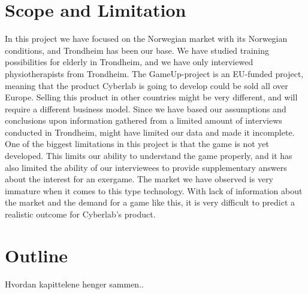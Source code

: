 \section{Scope and Limitation}
In this project we have focused on the Norwegian market with its Norwegian conditions, and Trondheim has been our base. We have studied training possibilities for elderly in Trondheim, and we have only interviewed physiotherapists from Trondheim. The GameUp-project is an EU-funded project, meaning that the product Cyberlab is going to develop could be sold all over Europe.  Selling this product in other countries might be very different, and will require a different business model. Since we have based our assumptions and conclusions upon information gathered from a limited amount of interviews conducted in Trondheim, might have limited our data and made it incomplete. One of the biggest limitations in this project is that the game is not yet developed. This limits our ability to understand the game properly, and it has also limited the ability of our interviewees to provide supplementary answers about the interest for an exergame.  The market we have observed is very immature when it comes to this type technology. With lack of information about the market and the demand for a game like this, it is very difficult to predict a realistic outcome for Cyberlab’s product.

\section{Outline}
Hvordan kapittelene henger sammen..